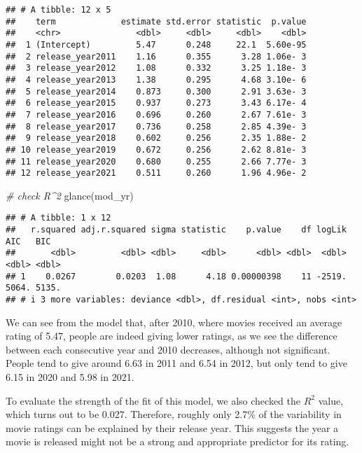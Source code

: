 \documentclass[
]{article}
\newenvironment{Shaded}{\begin{snugshade}}{\end{snugshade}}
\newcommand{\CommentTok}[1]{\textcolor[rgb]{0.56,0.35,0.01}{\textit{#1}}}
\newcommand{\FunctionTok}[1]{\textcolor[rgb]{0.00,0.00,0.00}{#1}}
\newcommand{\NormalTok}[1]{#1}
\begin{document}
\begin{verbatim}
## # A tibble: 12 x 5
##    term             estimate std.error statistic  p.value
##    <chr>               <dbl>     <dbl>     <dbl>    <dbl>
##  1 (Intercept)         5.47      0.248     22.1  5.60e-95
##  2 release_year2011    1.16      0.355      3.28 1.06e- 3
##  3 release_year2012    1.08      0.332      3.25 1.18e- 3
##  4 release_year2013    1.38      0.295      4.68 3.10e- 6
##  5 release_year2014    0.873     0.300      2.91 3.63e- 3
##  6 release_year2015    0.937     0.273      3.43 6.17e- 4
##  7 release_year2016    0.696     0.260      2.67 7.61e- 3
##  8 release_year2017    0.736     0.258      2.85 4.39e- 3
##  9 release_year2018    0.602     0.256      2.35 1.88e- 2
## 10 release_year2019    0.672     0.256      2.62 8.81e- 3
## 11 release_year2020    0.680     0.255      2.66 7.77e- 3
## 12 release_year2021    0.511     0.260      1.96 4.96e- 2
\end{verbatim}

\begin{Shaded}
\begin{Highlighting}[]
\CommentTok{\# check R\^{}2}
\FunctionTok{glance}\NormalTok{(mod\_yr)}
\end{Highlighting}
\end{Shaded}

\begin{verbatim}
## # A tibble: 1 x 12
##   r.squared adj.r.squared sigma statistic    p.value    df logLik   AIC   BIC
##       <dbl>         <dbl> <dbl>     <dbl>      <dbl> <dbl>  <dbl> <dbl> <dbl>
## 1    0.0267        0.0203  1.08      4.18 0.00000398    11 -2519. 5064. 5135.
## # i 3 more variables: deviance <dbl>, df.residual <int>, nobs <int>
\end{verbatim}

We can see from the model that, after 2010, where movies received an
average rating of 5.47, people are indeed giving lower ratings, as we
see the difference between each consecutive year and 2010 decreases,
although not significant. People tend to give around 6.63 in 2011 and
6.54 in 2012, but only tend to give 6.15 in 2020 and 5.98 in 2021.

To evaluate the strength of the fit of this model, we also checked the
\(R^2\) value, which turns out to be 0.027. Therefore, roughly only
2.7\% of the variability in movie ratings can be explained by their
release year. This suggests the year a movie is released might not be a
strong and appropriate predictor for its rating.
\end{document}
